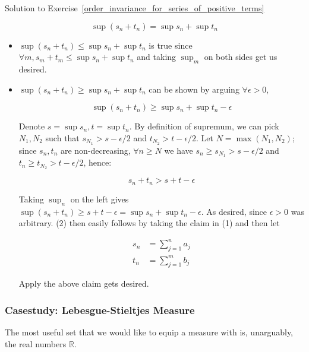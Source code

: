 \begin{mystsolution}{Solution to Exercise~\ref{order_invariance_for_series_of_positive_terms}}
\begin{enumerate}
\begin{equation}
\sup(s_n + t_n) = \sup s_n + \sup t_n
\end{equation}
\end{enumerate}

\begin{itemize}
\item $\sup(s_n + t_n) \leq \sup s_n + \sup t_n$ is true since $\forall m, s_m + t_m \leq \sup s_n + \sup t_n$ and taking $\sup_m$ on both sides get us desired.
\item $\sup(s_n + t_n) \geq \sup s_n + \sup t_n$ can be shown by arguing $\forall \epsilon > 0$,

\begin{equation}
\sup(s_n + t_n) \geq \sup s_n + \sup t_n - \epsilon
\end{equation}


Denote $s=\sup s_n, t = \sup t_n$. By definition of supremum, we can pick $N_1, N_2$ such that $s_{N_1} > s - \epsilon/2$ and $t_{N_2} > t - \epsilon/2$. Let $N=\max(N_1,N_2)$; since $s_n, t_n$ are non-decreasing, $\forall n \geq N$ we have $s_n \geq s_{N_1} > s -\epsilon/2$ and $t_n \geq t_{N_2} > t -\epsilon/2$, hence:

\begin{equation}
s_n + t_n >  s + t - \epsilon
\end{equation}


Taking $\sup_n$ on the left gives $\sup(s_n+t_n) \geq s+t -\epsilon = \sup s_n + \sup t_n - \epsilon$. As desired, since $\epsilon>0$ was arbitrary. (2) then easily follows by taking the claim in (1) and then let

\begin{equation}
\begin{aligned}
s_n &=\sum_{j=1}^n a_j \\
t_n &=\sum_{j=1}^m b_j
\end{aligned}
\end{equation}


Apply the above claim gets desired.
\end{itemize}

\end{mystsolution}
\subsubsection{Casestudy: Lebesgue-Stieltjes Measure}

The most useful set that we would like to equip a measure with is, unarguably, the real numbers $\mathbb{R}$.

